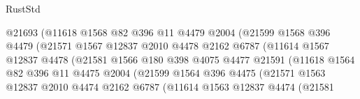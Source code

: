 \begin{lexlean}{RustStd}
\begin{coremodule}
                                  @21693
                                  (@11618
                                    @1568
                                    @82
                                    @396
                                    @11
                                    @4479
                                    @2004
                                    (@21599
                                      @1568
                                      @396
                                      @4479
                                      (@21571
                                        @1567
                                        @12837
                                        @2010
                                        @4478
                                        @2162
                                        @6787
                                        (@11614
                                          @1567
                                          @12837
                                          @4478
                                          (@21581
                                            @1566
                                            @180
                                            @398
                                            @4075
                                            @4477
                                            @21591
                                            (@11618
                                              @1564
                                              @82
                                              @396
                                              @11
                                              @4475
                                              @2004
                                              (@21599
                                                @1564
                                                @396
                                                @4475
                                                (@21571
                                                  @1563
                                                  @12837
                                                  @2010
                                                  @4474
                                                  @2162
                                                  @6787
                                                  (@11614
                                                    @1563
                                                    @12837
                                                    @4474
                                                    (@21581

\end{coremodule}
\end{lexlean}
